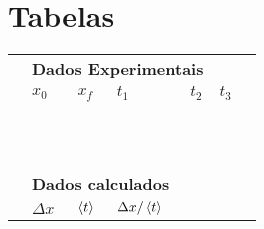 \section{Tabelas}

\begin{table*}[!ht]
\centering
\begin{tabular}{lp{25mm}p{25mm}p{25mm}p{25mm}p{25mm}l}
\toprule
	&\multicolumn{4}{l}{\textbf{Dados Experimentais}} \\
	\cmidrule{2-6}
	& $x_0$ & $x_f$ & $t_1$ & $t_2$ & $t_3$ & \\
	\cmidrule{2-6}
	& \cellcolor[gray]{0.89} & \cellcolor[gray]{0.92} & \cellcolor[gray]{0.89} & \cellcolor[gray]{0.92} & \cellcolor[gray]{0.89} \\
	& \cellcolor[gray]{0.95} & \cellcolor[gray]{0.97} & \cellcolor[gray]{0.95} & \cellcolor[gray]{0.97} & \cellcolor[gray]{0.95} \\
	& \cellcolor[gray]{0.89} & \cellcolor[gray]{0.92} & \cellcolor[gray]{0.89} & \cellcolor[gray]{0.92} & \cellcolor[gray]{0.89} \\
	& \cellcolor[gray]{0.95} & \cellcolor[gray]{0.97} & \cellcolor[gray]{0.95} & \cellcolor[gray]{0.97} & \cellcolor[gray]{0.95} \\
	& \cellcolor[gray]{0.89} & \cellcolor[gray]{0.92} & \cellcolor[gray]{0.89} & \cellcolor[gray]{0.92} & \cellcolor[gray]{0.89} \\
	& \cellcolor[gray]{0.95} & \cellcolor[gray]{0.97} & \cellcolor[gray]{0.95} & \cellcolor[gray]{0.97} & \cellcolor[gray]{0.95} \\
	& \cellcolor[gray]{0.89} & \cellcolor[gray]{0.92} & \cellcolor[gray]{0.89} & \cellcolor[gray]{0.92} & \cellcolor[gray]{0.89} \\
	& \cellcolor[gray]{0.95} & \cellcolor[gray]{0.97} & \cellcolor[gray]{0.95} & \cellcolor[gray]{0.97} & \cellcolor[gray]{0.95} \\
	& \cellcolor[gray]{0.89} & \cellcolor[gray]{0.92} & \cellcolor[gray]{0.89} & \cellcolor[gray]{0.92} & \cellcolor[gray]{0.89} \\
	& \cellcolor[gray]{0.95} & \cellcolor[gray]{0.97} & \cellcolor[gray]{0.95} & \cellcolor[gray]{0.97} & \cellcolor[gray]{0.95} \\
	\cmidrule{2-6}
\\
	& \multicolumn{3}{l}{\textbf{Dados calculados}} \\
	\cmidrule{2-4}
	& $\Delta x$ & $\left\langle{t}\right\rangle$ & $\Delta x / \left\langle{t}\right\rangle$ \\

\end{tabular}
\end{table*}
